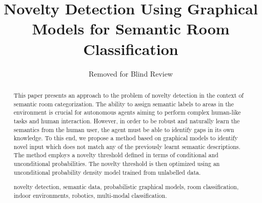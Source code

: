 \documentclass[runningheads,a4paper]{llncs}
\newcommand{\keywords}[1]{\par\addvspace\baselineskip
\noindent\keywordname\enspace\ignorespaces#1}
\begin{document}
\mainmatter  %

\title{Novelty Detection Using Graphical Models for Semantic Room Classification}


%
\author{Removed for Blind Review}
%


\maketitle


\begin{abstract}
This paper presents an approach to the problem of novelty
detection in the context of semantic room categorization.
The ability to assign semantic labels to areas in the environment is crucial for
autonomous agents aiming to perform complex human-like tasks and human
interaction.
However, in order to be robust and naturally learn the semantics from
the human user, the agent must be able to identify gaps in its own knowledge.
To this end, we propose a method based on graphical models to identify novel
input which does not match any of the previously learnt semantic descriptions.
The method employs a novelty threshold defined in terms of conditional
and unconditional probabilities. The novelty threshold is then optimized using
an unconditional probability density model trained from unlabelled data.


\keywords{novelty detection, semantic data, probabilistic graphical models,
room classification, indoor environments, robotics, multi-modal classification.}
\end{abstract}
\end{document}
